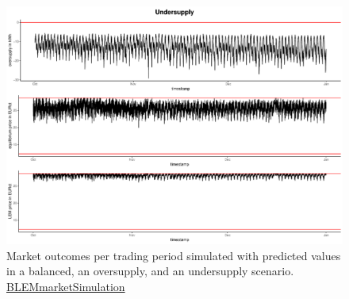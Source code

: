 \begin{figure}[H]
    \centering
    \includegraphics[width=\textwidth-.85cm]{thesis/graphs/marketsimulation/marketoutcome_pred_undersupply.pdf}
    \caption[Market outcomes simulated with predicted values in three supply scenarios]{Market outcomes per trading period simulated with predicted values in a balanced, an oversupply, and an undersupply scenario. \quantnet\href{https://github.com/QuantLet/BLEM/tree/master/BLEMmarketSimulation}{BLEMmarketSimulation}}
\end{figure}

